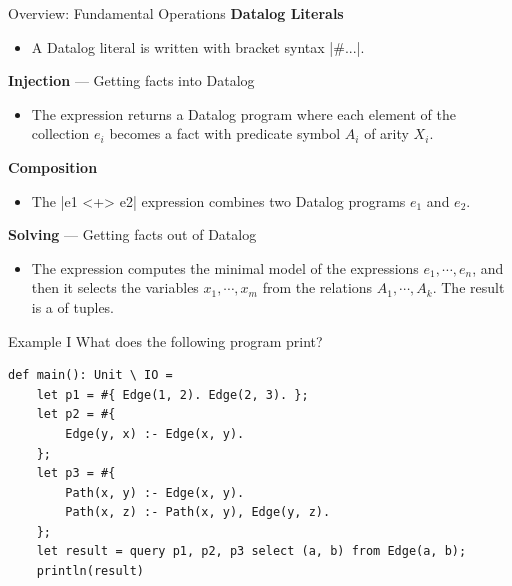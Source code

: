 \begin{frame}[fragile]{Overview: Fundamental Operations}
\textbf{Datalog Literals}
\begin{itemize}
    \small
    \item A Datalog literal is written with bracket syntax \Code|#{...}|.
\end{itemize}

\textbf{Injection} --- Getting facts into Datalog
\begin{itemize}
    \small
    \item The  expression returns a
    Datalog program where each element of the collection $e_i$ becomes a fact with
    predicate symbol $A_i$ of arity $X_i$.
\end{itemize}

\textbf{Composition}
\begin{itemize}
    \small
    \item The \Code|e1 <+> e2| expression combines two Datalog programs $e_1$
    and $e_2$.
\end{itemize}

\textbf{Solving} --- Getting facts out of Datalog
\begin{itemize}
    \small
    \item The 
    expression computes the minimal model of the expressions $e_1, \cdots, e_n$,
    and then it selects the variables $x_1, \cdots, x_m$ from the relations
    $A_1, \cdots, A_k$. The result is a  of tuples.
\end{itemize}
\end{frame}

\begin{frame}[fragile]{Example I}
What does the following program print?

\begin{lstlisting}[language=flix, xleftmargin=0.8cm]
def main(): Unit \ IO = 
    let p1 = #{ Edge(1, 2). Edge(2, 3). };
    let p2 = #{ 
        Edge(y, x) :- Edge(x, y). 
    };
    let p3 = #{ 
        Path(x, y) :- Edge(x, y).
        Path(x, z) :- Path(x, y), Edge(y, z).
    };
    let result = query p1, p2, p3 select (a, b) from Edge(a, b);
    println(result)
\end{lstlisting}
\end{frame}

